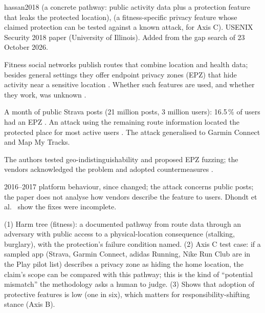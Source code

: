 \begin{papercard}{hassan2018}
  (a concrete pathway: public activity data plus a protection feature that leaks the protected location),  (a fitness-specific privacy feature whose claimed protection can be tested against a known attack, for Axis C). USENIX Security 2018 paper (University of Illinois). Added from the gap search of 23 October 2026.

 Fitness social networks publish routes that combine location and health data; besides general settings they offer endpoint privacy zones (EPZ) that hide activity near a sensitive location . Whether such features are used, and whether they work, was unknown .

 A month of public Strava posts (21 million posts, 3 million users): 16.5\,\% of users had an EPZ . An attack using the remaining route information located the protected place for most active users . The attack generalised to Garmin Connect and Map My Tracks.

 The authors tested geo-indistinguishability and proposed EPZ fuzzing; the vendors acknowledged the problem and adopted countermeasures .

 2016--2017 platform behaviour, since changed; the attack concerns public posts; the paper does not analyse how vendors describe the feature to users. Dhondt et al.\  show the fixes were incomplete.

 (1) Harm tree (fitness): a documented pathway from route data through an adversary with public access to a physical-location consequence (stalking, burglary), with the protection's failure condition named. (2) Axis C test case: if a sampled app (Strava, Garmin Connect, adidas Running, Nike Run Club are in the Play pilot list) describes a privacy zone as hiding the home location, the claim's scope can be compared with this pathway; this is the kind of ``potential mismatch'' the methodology asks a human to judge. (3) Shows that adoption of protective features is low (one in six), which matters for responsibility-shifting stance (Axis B).
\end{papercard}
